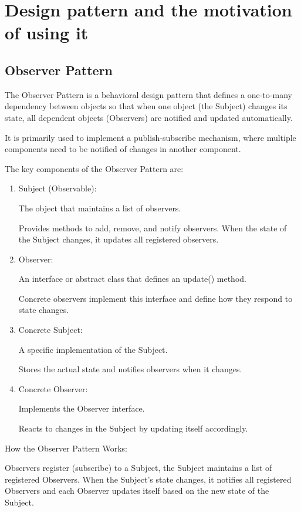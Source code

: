 \chapter{Design pattern and the motivation of using it}
\thispagestyle{pagestyle}
\section{Observer Pattern}
The Observer Pattern is a behavioral design pattern that defines a one-to-many dependency between objects so that when one object (the Subject) changes its state, all dependent objects (Observers) are notified and updated automatically.

It is primarily used to implement a publish-subscribe mechanism, where multiple components need to be notified of changes in another component.

The key components of the Observer Pattern are: 
\begin{enumerate}
    \item Subject (Observable): 
    
    The object that maintains a list of observers.
    
    Provides methods to add, remove, and notify observers.
    When the state of the Subject changes, it updates all registered observers.
    \item Observer: 
    
    An interface or abstract class that defines an update() method.

    
    Concrete observers implement this interface and define how they respond to state changes.
    \item Concrete Subject: 

    A specific implementation of the Subject.

    
    Stores the actual state and notifies observers when it changes.
    \item Concrete Observer:

    Implements the Observer interface.

    
    Reacts to changes in the Subject by updating itself accordingly.
\end{enumerate}

How the Observer Pattern Works:


Observers register (subscribe) to a Subject, the Subject maintains a list of registered Observers. When the Subject's state changes, it notifies all registered Observers and each Observer updates itself based on the new state of the Subject.

